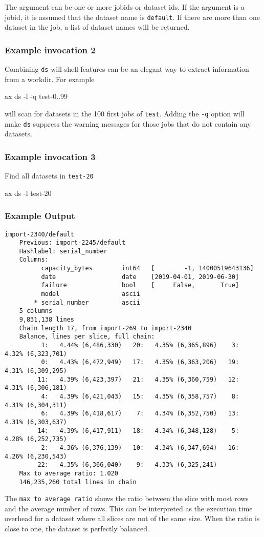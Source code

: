 The argument can be one or more jobids or dataset ids.  If the
argument is a jobid, it is assumed that the dataset name is
\texttt{default}.  If there are more than one dataset in the job, a
list of dataset names will be returned.

\subsubsection*{Example invocation 2}
Combining \texttt{ds} will shell features can be an elegant way to
extract information from a workdir.  For example
\begin{shell}
ax ds -l -q test-{0..99}
\end{shell}
will scan for datasets in the 100 first jobs of \texttt{test}.
Adding the \texttt{-q} option will make \texttt{ds} suppress the
warning messages for those jobs that do not contain any datasets.

\subsubsection*{Example invocation 3}
Find all datasets in \texttt{test-20}
\begin{shell}
ax ds -l test-20
\end{shell}

\subsubsection*{Example Output}
\begin{snugshade}
\begin{verbatim}
import-2340/default
    Previous: import-2245/default
    Hashlabel: serial_number
    Columns:
          capacity_bytes        int64   [        -1, 14000519643136]
          date                  date    [2019-04-01, 2019-06-30]
          failure               bool    [     False,       True]
          model                 ascii
        * serial_number         ascii
    5 columns
    9,831,138 lines
    Chain length 17, from import-269 to import-2340
    Balance, lines per slice, full chain:
          1:   4.44% (6,486,330)   20:   4.35% (6,365,896)    3:   4.32% (6,323,701)
          0:   4.43% (6,472,949)   17:   4.35% (6,363,206)   19:   4.31% (6,309,295)
         11:   4.39% (6,423,397)   21:   4.35% (6,360,759)   12:   4.31% (6,306,181)
          4:   4.39% (6,421,043)   15:   4.35% (6,358,757)    8:   4.31% (6,304,311)
          6:   4.39% (6,418,617)    7:   4.34% (6,352,750)   13:   4.31% (6,303,637)
         14:   4.39% (6,417,911)   18:   4.34% (6,348,128)    5:   4.28% (6,252,735)
          2:   4.36% (6,376,139)   10:   4.34% (6,347,694)   16:   4.26% (6,230,543)
         22:   4.35% (6,366,040)    9:   4.33% (6,325,241)
    Max to average ratio: 1.020
    146,235,260 total lines in chain
\end{verbatim}
\end{snugshade}
The \texttt{max to average ratio} shows the ratio between the slice
with most rows and the average number of rows.  This can be
interpreted as the execution time overhead for a dataset where all
slices are not of the same size.  When the ratio is close to one, the
dataset is perfectly balanced.


